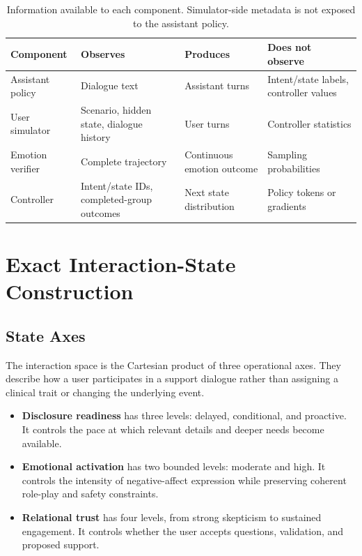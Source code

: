 \begin{table}[t]
\centering
\small
\begin{tabular}{lp{}p{}p{}}
\toprule
Component & Observes & Produces & Does not observe \\
\midrule
Assistant policy & Dialogue text & Assistant turns & Intent/state labels, controller values \\
User simulator & Scenario, hidden state, dialogue history & User turns & Controller statistics \\
Emotion verifier & Complete trajectory & Continuous emotion outcome & Sampling probabilities \\
Controller & Intent/state IDs, completed-group outcomes & Next state distribution & Policy tokens or gradients \\
\bottomrule
\end{tabular}
\caption{Information available to each component. Simulator-side metadata is
not exposed to the assistant policy.}
\label{tab:supp-information-flow}
\end{table}

\section{Exact Interaction-State Construction}
\subsection{State Axes}
The interaction space is the Cartesian product of three operational axes. They
describe how a user participates in a support dialogue rather than assigning a
clinical trait or changing the underlying event.

\begin{itemize}
  \item \textbf{Disclosure readiness} has three levels: delayed, conditional,
  and proactive. It controls the pace at which relevant details and deeper
  needs become available.
  \item \textbf{Emotional activation} has two bounded levels: moderate and
  high. It controls the intensity of negative-affect expression while
  preserving coherent role-play and safety constraints.
  \item \textbf{Relational trust} has four levels, from strong skepticism to
  sustained engagement. It controls whether the user accepts questions,
  validation, and proposed support.
\end{itemize}

